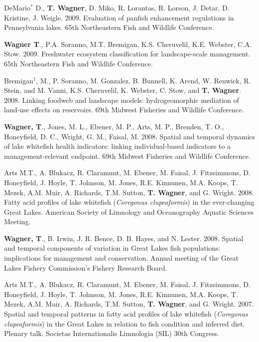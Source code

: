 \documentclass[10pt]{article}
\begin{document}
\begin{flushleft}
\begin{etaremune}
\item DeMario$^*$ D., {\bf T. Wagner}, D. Miko, R. Lorantas, R. Lorson, J. Detar, D. Kristine, J. Weigle. 2009. Evaluation of panfish enhancement regulations in Pennsylvania lakes. 65th Northeastern Fish and Wildlife Conference.

\item {\bf Wagner T}., P.A. Soranno, M.T. Bremigan, K.S. Cheruvelil, K.E. Webster, C.A. Stow. 2009. Freshwater ecosystem classification for landscape-scale management. 65th Northeastern Fish and Wildlife Conference.


\item Bremigan$^\ddagger$, M., P. Soranno, M. Gonzalez,  B. Bunnell, K. Arend, W. Renwick, R. Stein, and M. Vanni, K.S. Cheruvelil, K. Webster, C. Stow, and {\bf T. Wagner}. 2008. Linking foodweb and landscape models: hydrogeomorphic mediation of land-use effects on reservoirs. 69th Midwest Fisheries and Wildlife Conference.

\item {\bf Wagner, T}., Jones, M. L., Ebener, M. P., Arts, M. P., Brenden, T. O., Honeyfield, D. C., Wright, G. M., Faisal, M. 2008. Spatial and temporal dynamics of lake whitefish health indicators: linking individual-based indicators to a management-relevant endpoint. 69th Midwest Fisheries and Wildlife Conference.

\item Arts M.T., A. Blukacz, R. Claramunt, M. Ebener, M. Faisal, J. Fitzsimmons, D. Honeyfield, J. Hoyle, T. Johnson, M. Jones, R.E. Kinnunen, M.A. Koops, T. Mezek, A.M. Muir, A. Richards, T.M. Sutton, {\bf T. Wagner}, and G. Wright. 2008. Fatty acid profiles of lake whitefish (\emph{Coregonus clupeaformis}) in the ever-changing Great Lakes. American Society of Limnology and Oceanography Aquatic Sciences Meeting.

\item {\bf Wagner, T}., B. Irwin, J. R. Bence, D. B. Hayes, and N. Lester. 2008. Spatial and temporal components of variation in Great Lakes fish populations: implications for management and conservation.  Annual meeting of the Great Lakes Fishery Commission’s Fishery Research Board.


\item Arts M.T., A. Blukacz, R. Claramunt, M. Ebener, M. Faisal, J. Fitzsimmons, D. Honeyfield, J. Hoyle, T. Johnson, M. Jones, R.E. Kinnunen, M.A. Koops, T. Mezek, A.M. Muir, A. Richards, T.M. Sutton, {\bf T. Wagner}, and G. Wright. 2007. Spatial and temporal patterns in fatty acid profiles of lake whitefish (\emph{Coregonus clupeaformis}) in the Great Lakes in relation to fish condition and inferred diet. Plenary talk. Societas Internationalis Limnologia (SIL) 30th Congress. 


\end{etaremune}
\end{flushleft}
\end{document}
